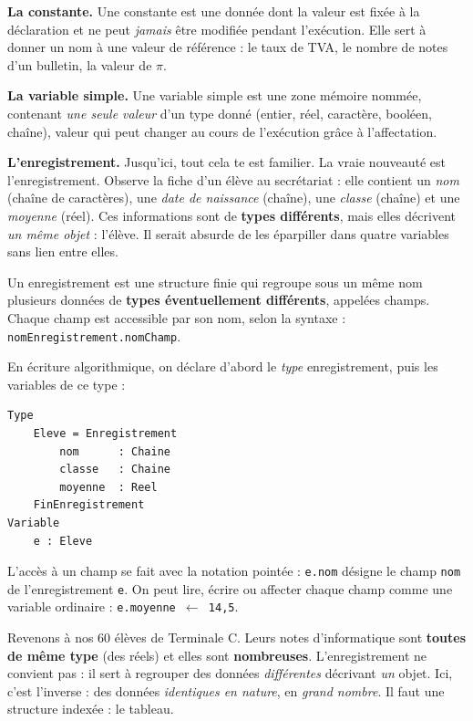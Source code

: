 \documentclass[11pt]{article}
\newcommand{\cle}[1]{{\popxbold\color{popdark}#1}}
\newcounter{popsec}
\newcounter{popsub}
\newcommand{\courssub}[1]{%
  \stepcounter{popsub}%
  \par\vspace{9pt}\noindent{\popxbold\fontsize{11.5}{13}\selectfont\color{popink}{\color{poporange}\thepopsec.\thepopsub}\hspace{6pt}#1}\par\nopagebreak\vspace{4pt}
}
\begin{document}
\textbf{La constante.} Une \cle{constante} est une donnée dont la valeur est fixée à la déclaration et ne peut \emph{jamais} être modifiée pendant l'exécution. Elle sert à donner un nom à une valeur de référence : le taux de TVA, le nombre de notes d'un bulletin, la valeur de $\pi$.

\textbf{La variable simple.} Une \cle{variable simple} est une zone mémoire nommée, contenant \emph{une seule valeur} d'un type donné (entier, réel, caractère, booléen, chaîne), valeur qui peut changer au cours de l'exécution grâce à l'affectation.

\textbf{L'enregistrement.} Jusqu'ici, tout cela te est familier. La vraie nouveauté est l'\cle{enregistrement}. Observe la fiche d'un élève au secrétariat : elle contient un \emph{nom} (chaîne de caractères), une \emph{date de naissance} (chaîne), une \emph{classe} (chaîne) et une \emph{moyenne} (réel). Ces informations sont de \textbf{types différents}, mais elles décrivent \emph{un même objet} : l'élève. Il serait absurde de les éparpiller dans quatre variables sans lien entre elles.

\begin{definition}[Enregistrement]
Un \cle{enregistrement} est une structure finie qui regroupe sous un même nom plusieurs données de \textbf{types éventuellement différents}, appelées \cle{champs}. Chaque champ est accessible par son nom, selon la syntaxe : \texttt{nomEnregistrement.nomChamp}.
\end{definition}

\begin{propriete}
En écriture algorithmique, on déclare d'abord le \emph{type} enregistrement, puis les variables de ce type :
\begin{lstlisting}
Type
    Eleve = Enregistrement
        nom      : Chaine
        classe   : Chaine
        moyenne  : Reel
    FinEnregistrement
Variable
    e : Eleve
\end{lstlisting}
L'accès à un champ se fait avec la notation pointée : \texttt{e.nom} désigne le champ \texttt{nom} de l'enregistrement \texttt{e}. On peut lire, écrire ou affecter chaque champ comme une variable ordinaire : \texttt{e.moyenne $\leftarrow$ 14{,}5}.
\end{propriete}

\courssub{Les structures indexées : les tableaux}

Revenons à nos 60 élèves de Terminale C. Leurs notes d'informatique sont \textbf{toutes de même type} (des réels) et elles sont \textbf{nombreuses}. L'enregistrement ne convient pas : il sert à regrouper des données \emph{différentes} décrivant \emph{un} objet. Ici, c'est l'inverse : des données \emph{identiques en nature}, en \emph{grand nombre}. Il faut une structure indexée : le \cle{tableau}.
\end{document}
